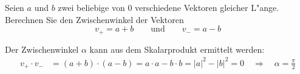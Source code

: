 Seien $a$ und $b$ zwei beliebige von $0$ verschiedene Vektoren gleicher L"ange.
Berechnen Sie den Zwischenwinkel der Vektoren
\[
v_+=a+b
\qquad\text{und}\qquad
v_-=a -b
\]

\begin{loesung}
Der Zwischenwinkel  $\alpha$ kann aus dem Skalarprodukt ermittelt werden:
\begin{align*}
v_+\cdot v_-
&=
(a+b) \cdot (a-b)
=
a\cdot a-b\cdot b=|a|^2-|b|^2=0\quad\Rightarrow\quad \alpha=\frac{\pi}2
\end{align*}
\end{loesung}

